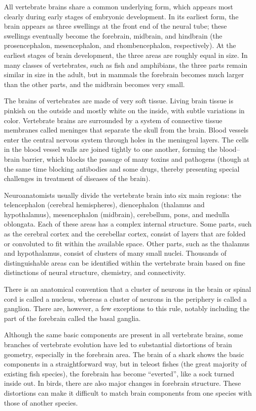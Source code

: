 \documentclass[]{book}
\begin{document}
All vertebrate brains share a common underlying form, which appears most clearly during early stages of embryonic development. In its earliest form, the brain appears as three swellings at the front end of the neural tube; these swellings eventually become the forebrain, midbrain, and hindbrain (the prosencephalon, mesencephalon, and rhombencephalon, respectively). At the earliest stages of brain development, the three areas are roughly equal in size. In many classes of vertebrates, such as fish and amphibians, the three parts remain similar in size in the adult, but in mammals the forebrain becomes much larger than the other parts, and the midbrain becomes very small.

The brains of vertebrates are made of very soft tissue. Living brain tissue is pinkish on the outside and mostly white on the inside, with subtle variations in color. Vertebrate brains are surrounded by a system of connective tissue membranes called meninges that separate the skull from the brain. Blood vessels enter the central nervous system through holes in the meningeal layers. The cells in the blood vessel walls are joined tightly to one another, forming the blood--brain barrier, which blocks the passage of many toxins and pathogens (though at the same time blocking antibodies and some drugs, thereby presenting special challenges in treatment of diseases of the brain).

Neuroanatomists usually divide the vertebrate brain into six main regions: the telencephalon (cerebral hemispheres), diencephalon (thalamus and hypothalamus), mesencephalon (midbrain), cerebellum, pons, and medulla oblongata. Each of these areas has a complex internal structure. Some parts, such as the cerebral cortex and the cerebellar cortex, consist of layers that are folded or convoluted to fit within the available space. Other parts, such as the thalamus and hypothalamus, consist of clusters of many small nuclei. Thousands of distinguishable areas can be identified within the vertebrate brain based on fine distinctions of neural structure, chemistry, and connectivity.

There is an anatomical convention that a cluster of neurons in the brain or spinal cord is called a nucleus, whereas a cluster of neurons in the periphery is called a ganglion. There are, however, a few exceptions to this rule, notably including the part of the forebrain called the basal ganglia.

Although the same basic components are present in all vertebrate brains, some branches of vertebrate evolution have led to substantial distortions of brain geometry, especially in the forebrain area. The brain of a shark shows the basic components in a straightforward way, but in teleost fishes (the great majority of existing fish species), the forebrain has become ``everted'', like a sock turned inside out. In birds, there are also major changes in forebrain structure. These distortions can make it difficult to match brain components from one species with those of another species.
\end{document}

